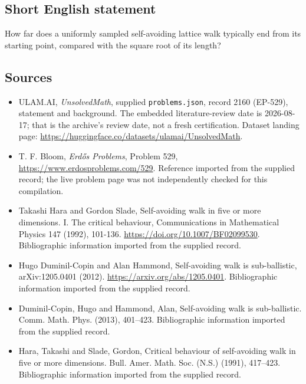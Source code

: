 \documentclass[11pt,a4paper]{article}
\begin{document}
\subsection{Short English statement}

How far does a uniformly sampled self-avoiding lattice walk typically end from its starting point, compared with the square root of its length?

\subsection{Sources}

{\small

\begin{itemize}

\item[\hypertarget{source:2160:1}{S1}] ULAM.AI, \emph{UnsolvedMath}, supplied \texttt{problems.json}, record 2160 (EP-529), statement and background. The embedded literature-review date is 2026-08-17; that is the archive’s review date, not a fresh certification. Dataset landing page: \url{https://huggingface.co/datasets/ulamai/UnsolvedMath}.

\item[\hypertarget{source:2160:2}{S2}] T. F. Bloom, \emph{Erdős Problems}, Problem 529, \url{https://www.erdosproblems.com/529}. Reference imported from the supplied record; the live problem page was not independently checked for this compilation.

\item[\hypertarget{source:2160:3}{S3}] Takashi Hara and Gordon Slade, Self-avoiding walk in five or more dimensions. I. The critical behaviour, Communications in Mathematical Physics 147 (1992), 101-136. \url{https://doi.org/10.1007/BF02099530}. Bibliographic information imported from the supplied record.

\item[\hypertarget{source:2160:4}{S4}] Hugo Duminil-Copin and Alan Hammond, Self-avoiding walk is sub-ballistic, arXiv:1205.0401 (2012). \url{https://arxiv.org/abs/1205.0401}. Bibliographic information imported from the supplied record.

\item[\hypertarget{source:2160:5}{S5}] Duminil-Copin, Hugo and Hammond, Alan, Self-avoiding walk is sub-ballistic. Comm. Math. Phys. (2013), 401--423. Bibliographic information imported from the supplied record.

\item[\hypertarget{source:2160:6}{S6}] Hara, Takashi and Slade, Gordon, Critical behaviour of self-avoiding walk in five or more dimensions. Bull. Amer. Math. Soc. (N.S.) (1991), 417--423. Bibliographic information imported from the supplied record.

\end{itemize}

}

\label{end:2160}
\end{document}
